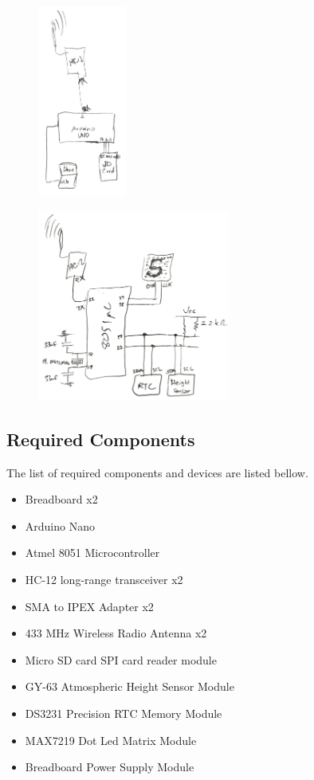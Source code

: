 \documentclass[12pt]{article}
\begin{document}
\begin{figure}[H]
\centering
\begin{minipage}{.4\textheight}
  \centering
  \includegraphics[height=6.3cm]{rx.jpg}
  \label{fig:rx}
\end{minipage}%
\begin{minipage}{.4\textheight}
  \centering
  \includegraphics[height=6.3cm]{tx.jpg}
  \label{fig:tx}
\end{minipage}
\end{figure}


\subsection{Required Components}
The list of required components and devices are listed bellow.
\begin{itemize}
\item Breadboard x2
\item Arduino Nano
\item Atmel 8051 Microcontroller
\item HC-12 long-range transceiver x2
\item SMA to IPEX Adapter x2
\item 433 MHz Wireless Radio Antenna x2
\item Micro SD card SPI card reader module  
\item GY-63 Atmospheric Height Sensor Module
\item DS3231 Precision RTC Memory Module
\item MAX7219 Dot Led Matrix Module
\item Breadboard Power Supply Module
\end{itemize}
\end{document}

